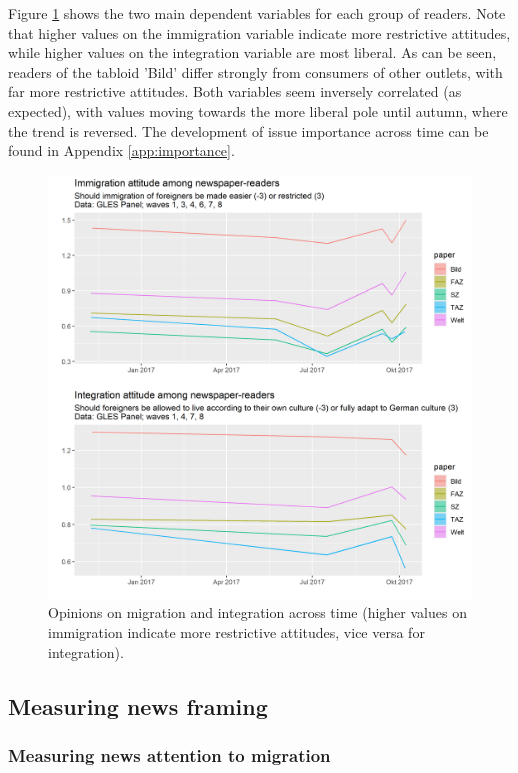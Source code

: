 \documentclass{article}
\begin{document}
Figure \ref{fig:issues} shows the two main dependent variables for each group of readers. Note that higher values on the immigration variable indicate more restrictive attitudes, while higher values on the integration variable are most liberal. As can be seen, readers of the tabloid 'Bild' differ strongly from consumers of other outlets, with far more restrictive attitudes. Both variables seem inversely correlated (as expected), with values moving towards the more liberal pole until autumn, where the trend is reversed. The development of issue importance across time can be found in Appendix \ref{app:importance}.

\begin{figure}[!ht]
    \centering
    \includegraphics[width=\textwidth]{paper/vis/issues_readers.png}
    \caption{Opinions on migration and integration across time (higher values on immigration indicate more restrictive attitudes, vice versa for integration).}
    \label{fig:issues}
\end{figure}


\subsection{Measuring news framing}

\subsubsection{Measuring news attention to migration}
\end{document}
